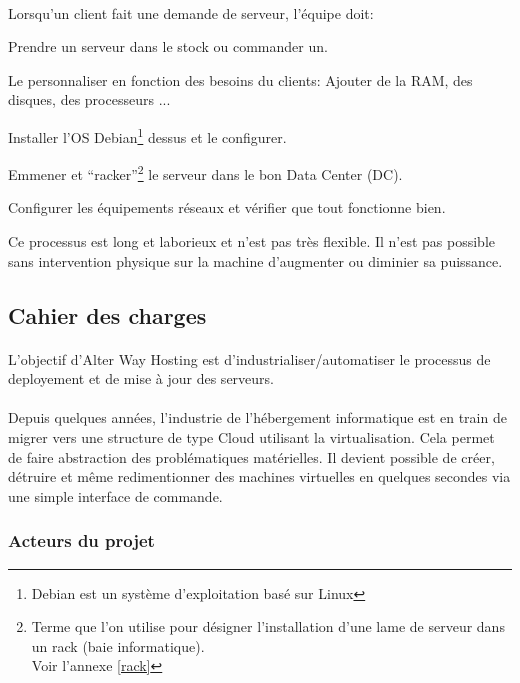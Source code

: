 \paragraph*{}
Lorsqu'un client fait une demande de serveur, l'équipe doit:
\begin{listi}
	\item Prendre un serveur dans le stock ou commander un.
	\item Le personnaliser en fonction des besoins du clients: Ajouter de la RAM, des disques, des processeurs ...
	\item Installer l'OS Debian\footnote{Debian est un système d'exploitation basé sur Linux} dessus et le configurer.
	\item Emmener et ``racker''\footnote{Terme que l'on utilise pour désigner l'installation d'une lame de serveur dans un rack (baie informatique).\\
		Voir l'annexe \ref{rack}} le serveur
	dans le bon Data Center (DC).
	\item Configurer les équipements réseaux et vérifier que tout fonctionne bien.
\end{listi}

Ce processus est long et laborieux et n'est pas très flexible. Il n'est pas possible sans intervention physique sur la machine d'augmenter ou diminier sa puissance.

\subsection{Cahier des charges}
\paragraph*{}
L'objectif d'Alter Way Hosting est d'industrialiser/automatiser le processus de deployement et de mise à jour des serveurs.

\paragraph*{}
Depuis quelques années, l'industrie de l'hébergement informatique est en train de migrer vers une structure de type Cloud utilisant la virtualisation.
Cela permet de faire abstraction des problématiques matérielles. Il devient possible de créer, détruire et même redimentionner des machines virtuelles en
quelques secondes via une simple interface de commande.

\subsubsection{Acteurs du projet}

